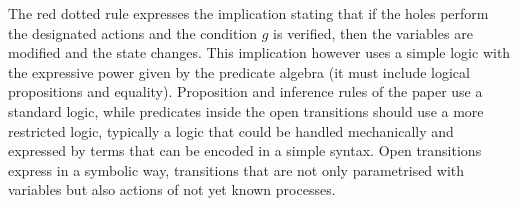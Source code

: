 \documentclass{llncs}
\newcommand{\Simon}{\\\hfill\mdash Simon}
\newcommand{\noteSB}[2][color=green!40, size=\tiny]{\todo[#1]{{#2}\Simon}}
\newcommand{\Ludo}{\\\hfill\mdash Ludo}
\newcommand{\noteLH}[2][color=orange!40, size=\tiny]{\todo[#1]{{#2}\Ludo}}
\newcommand{\newCoord}[1]{{\color{blue}#1}}
\newcommand{\mdash}[1][]{---#1}
\newcommand{\goesto}[2][]{\ensuremath{\xrightarrow[{#1}\relax]{#2}}}
\begin{document}



\newCoord{The red dotted rule expresses the implication stating that if the holes perform the designated actions and the condition $g$ is verified, then the variables are modified and the state changes. This implication however  uses a simple logic with the 
 expressive power  given by the predicate algebra (it must include logical 
 propositions and equality). 
 Proposition and inference rules of the paper use a standard logic, while predicates inside the open transitions should use a more restricted logic, typically a logic that could  be handled mechanically and expressed by terms that can be encoded in a simple syntax.
Open transitions express in a symbolic way, transitions  that are not only parametrised with variables but also actions of not yet known processes.}
\end{document}
